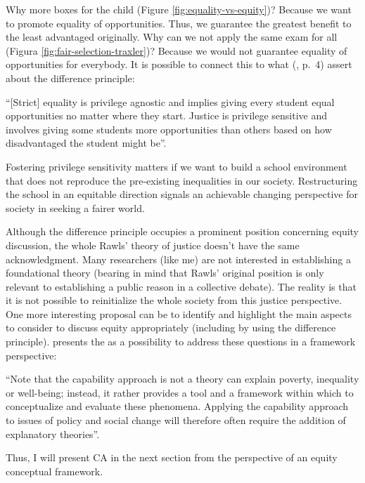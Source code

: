 Why more boxes for the child (Figure \ref{fig:equality-vs-equity})? Because we want to promote equality of opportunities. Thus, we guarantee the greatest benefit to the least advantaged originally. Why can we not apply the same exam for all (Figura \ref{fig:fair-selection-traxler})? Because we would not guarantee equality of opportunities for everybody. It is possible to connect this to what  (\citeyear{parker:2015}, p.~4) assert about the difference principle:
\begin{citacao}
    “[Strict] equality is privilege agnostic and implies giving every student equal opportunities no matter where they start. Justice is privilege sensitive and involves giving some students more opportunities than others based on how disadvantaged the student might be”.
\end{citacao}
Fostering privilege sensitivity matters if we want to build a school environment that does not reproduce the pre-existing inequalities in our society. Restructuring the school in an equitable direction signals an achievable changing perspective for society in seeking a fairer world.

Although the difference principle occupies a prominent position concerning equity discussion, the whole Rawls' theory of justice doesn't have the same acknowledgment. Many researchers (like me) are not interested in establishing a foundational theory (bearing in mind that Rawls' original position is only relevant to establishing a public reason in a collective debate). The reality is that it is not possible to reinitialize the whole society from this justice perspective. One more interesting proposal can be to identify and highlight the main aspects to consider to discuss equity appropriately (including by using the difference principle).  presents the  as a possibility to address these questions in a framework perspective:
\begin{citacao}
    “Note that the capability approach is not a theory can explain poverty, inequality or well-being; instead, it rather provides a tool and a framework within which to conceptualize and evaluate these phenomena. Applying the capability approach to issues of policy and social change will therefore often require the addition of explanatory theories”.
\end{citacao}
Thus, I will present \gls{CA} in the next section from the perspective of an equity 
 conceptual framework.
        
